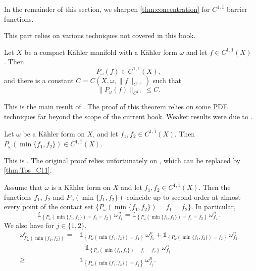 In the remainder of this section, we sharpen \cref{thm:concentration} for $C^{1,\overline{1}}$ barrier functions.

This part relies on various techniques not covered in this book.




\begin{theorem}\label{thm:Tos_C11}
Let $X$ be a compact Kähler manifold with a Kähler form $\omega$ and let $f\in C^{1,1}(X)$. Then
\[
P_\omega(f)\in C^{1,1}(X),
\]
and there is a constant $C=C(X,\omega,\|f\|_{C^{1,1}})$ such that
\[
    \|P_\omega(f)\|_{C^{1,1}}\leq C.
\]
\end{theorem}
This is the main result of \cite{Tos18,CZ19}. The proof of this theorem relies on some PDE techniques far beyond the scope of the current book. Weaker results were due to \cite{Ber09, Ber19}.


\begin{proposition}\label{prop:DR16_C11bar}
Let $\omega$ be a K\"ahler form on $X$, and let $f_1,f_2\in C^{1,\overline{1}}(X)$. Then $P_\omega(\min\{f_1,f_2\})\in C^{1,\overline{1}}(X)$.
\end{proposition}
This is \cite[Theorem~2.5]{DR16}. The original proof relies unfortunately on \cite{BD12}, which can be replaced by \cref{thm:Tos_C11}.



\begin{lemma}\label{lma:DNTroof}
Assume that $\omega$ is a K\"ahler form on $X$ and let $f_1,f_2\in C^{1,\overline{1}}(X)$. Then the functions $f_1$, $f_2$ and $P_\omega(\min\{f_1,f_2\})$ coincide up to second order at almost every point of the contact set $\{P_\omega(\min\{f_1,f_2\})=f_1=f_2\}$. In particular,
\[
    \mathds{1}_{\left\{P_\omega\left(\min\{f_1,f_2\}\right)=f_1=f_2\right\}}\,\omega_{f_1}^n=\mathds{1}_{\left\{P_\omega\left(\min\{f_1,f_2\}\right)=f_1=f_2\right\}}\,\omega_{f_2}^n.
\]
We also have for $j\in \{1,2\}$,
\begin{equation}\label{eq:DNTroof_Pomega}
    \begin{aligned}
    \omega^n_{P_\omega\left(\min\{f_1,f_2\}\right)} = & \mathds{1}_{\left\{P_\omega\left(\min\{f_1,f_2\}\right)=f_1\right\}}\,\omega^n_{f_1} + \mathds{1}_{\left\{P_\omega\left(\min\{f_1,f_2\}\right)=f_2\right\}}\,\omega^n_{f_2} \\
    &- \mathds{1}_{\left\{P_\omega(\min\{f_1,f_2\})=f_1=f_2\right\}}\,\omega^n_{f_j}\\
    \geq & \mathds{1}_{\left\{P_\omega\left(\min\{f_1,f_2\}\right)=f_j\right\}}\,\omega^n_{f_j}.
    \end{aligned}
\end{equation}
\end{lemma}

